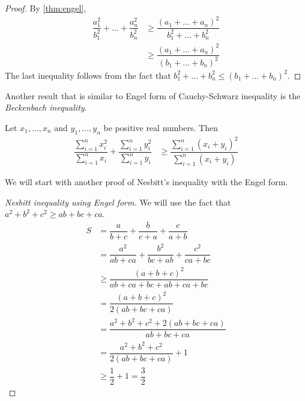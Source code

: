 \documentclass{subfile}
\begin{document}
		\begin{proof}
			By \autoref{thm:engel},
				\begin{align*}
					\dfrac{a_1^2}{b_1^2}+\ldots+\dfrac{a_n^2}{b_n^2}
						& \geq\dfrac{(a_1+\ldots+a_n)^2}{b_1^2+\ldots+b_n^2}\\
						& \geq\dfrac{(a_1+\ldots+a_n)^2}{(b_1+\ldots+b_n)^2}
				\end{align*}
			The last inequality follows from the fact that $b_1^2+\ldots+b_n^2\leq(b_1+\ldots+b_n)^2$.
		\end{proof}
	Another result that is similar to Engel form of Cauchy-Schwarz inequality is the \textit{Beckenbach inequality}.
		\begin{theorem}
			Let $x_{1},\ldots,x_{n}$ and $y_{1},\ldots,y_{n}$ be positive real numbers. Then
				\begin{align*}
					\dfrac{\sum_{i=1}^{n}x_{i}^{2}}{\sum_{i=1}^{n}x_{i}}+\dfrac{\sum_{i=1}^{n}y_{i}^{2}}{\sum_{i=1}^{n}y_{i}}
						& \geq \dfrac{\sum_{i=1}^{n}(x_{i}+y_{i})^{2}}{\sum_{i=1}^{n}(x_{i}+y_{i})}
				\end{align*}
		\end{theorem}
	We will start with another proof of Nesbitt's inequality with the Engel form.
		\begin{proof}[Nesbitt inequality using Engel form]
			We will use the fact that $a^2+b^2+c^2\geq ab+bc+ca$.
				\begin{align*}
					S
						& = \dfrac{a}{b+c}+\dfrac{b}{c+a}+\dfrac{c}{a+b}\\
						& = \dfrac{a^2}{ab+ca}+\dfrac{b^2}{bc+ab}+\dfrac{c^2}{ca+bc}\\
						& \geq\dfrac{(a+b+c)^2}{ab+ca+bc+ab+ca+bc}\\
						& = \dfrac{(a+b+c)^2}{2(ab+bc+ca)}\\
						& = \dfrac{a^2+b^2+c^2+2(ab+bc+ca)}{ab+bc+ca}\\
						& = \dfrac{a^2+b^2+c^2}{2(ab+bc+ca)}+1\\
						& \geq\dfrac{1}{2}+1=\dfrac{3}{2}
				\end{align*}
		\end{proof}
	
\end{document}
